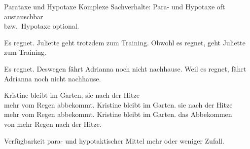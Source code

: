 \begin{frame}
  {Parataxe und Hypotaxe}
  \pause
  Komplexe Sachverhalte: \alert{Para- und Hypotaxe} oft austauschbar\\
  bzw.\ \alert{Hypotaxe optional}.
  \pause
  \Halbzeile
  \begin{exe}
    \ex\begin{xlist}
      \ex Es regnet. Juliette geht \alert{trotzdem} zum Training.
      \pause
      \ex \alert{Obwohl} es regnet, geht Juliette zum Training.
    \end{xlist}
    \Halbzeile
    \pause
    \ex\begin{xlist}
      \ex Es regnet. \alert{Deswegen} fährt Adrianna noch nicht nachhause.
      \pause
      \ex \alert{Weil} es regnet, fährt Adrianna noch nicht nachhause.
    \end{xlist}
    \pause
    \Halbzeile
    \ex\begin{xlist}
      \ex Kristine bleibt im Garten,  sie nach der Hitze\\
      mehr vom Regen abbekommt.
      \pause
      \ex Kristine bleibt im Garten.  sie nach der Hitze\\
      mehr vom Regen abbekommt.
      \pause
      \ex Kristine bleibt im Garten.  das Abbekommen\\
      von mehr Regen nach der Hitze.
    \end{xlist}
  \end{exe}
  \Halbzeile
  \pause
  \alert{Verfügbarkeit para- und hypotaktischer Mittel mehr oder weniger Zufall.}
\end{frame}

